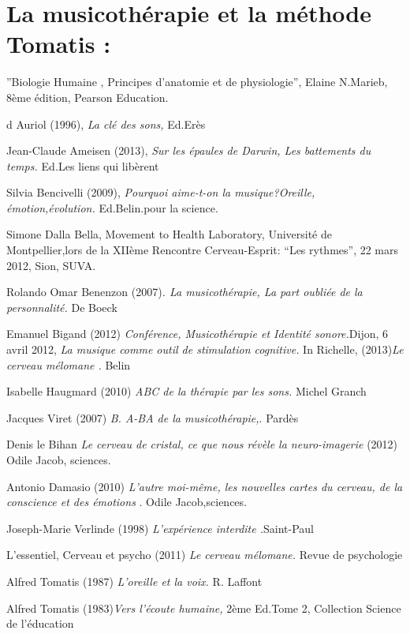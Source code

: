 \documentclass[12pt,french]{report}
\begin{document}
\section{La musicothérapie et la méthode Tomatis : }
\begin{thebibliography}{10}
''Biologie Humaine , Principes d'anatomie et de physiologie'',
Elaine N.Marieb, 8ème édition, Pearson Education.

d Auriol (1996), \emph{La clé des sons, }Ed.Erès

Jean-Claude Ameisen (2013), \emph{Sur les épaules
de Darwin, Les battements du temps. }Ed\emph{.}Les liens qui libèrent

Silvia Bencivelli (2009),\emph{ Pourquoi aime-t-on
la musique?Oreille, émotion,évolution. }Ed.Belin.pour la science.

Simone Dalla Bella, Movement to Health Laboratory,
Université de Montpellier,lors de la XIIème Rencontre Cerveau-Esprit:
``Les rythmes'', 22 mars 2012, Sion, SUVA.

Rolando Omar Benenzon (2007)\emph{. La musicothérapie,
La part oubliée de la personnalité. }De Boeck

Emanuel Bigand (2012) \emph{Conférence, Musicothérapie
et Identité sonore.}Dijon, 6 avril 2012,\emph{ La musique comme outil
de stimulation cognitive. }In Richelle, (2013)\emph{Le cerveau mélomane
. }Belin

Isabelle Haugmard (2010) \emph{ABC de la thérapie
par les sons. }Michel Granch

Jacques Viret (2007) \emph{B. A-BA de la musicothérapie,}.
Pardès

Denis le Bihan \emph{Le cerveau de cristal, ce que
nous révèle la neuro-imagerie} (2012) Odile Jacob, sciences.

Antonio Damasio (2010) \emph{L'autre moi-même, les
nouvelles cartes du cerveau, de la conscience et des émotions }. Odile
Jacob,sciences.

Joseph-Marie Verlinde (1998) \emph{L'expérience interdite
.}Saint-Paul

L'essentiel, Cerveau et psycho (2011) \emph{Le cerveau
mélomane. }Revue de psychologie

Alfred Tomatis (1987) \emph{L'oreille et la voix.
}R. Laffont

Alfred Tomatis\emph{ }(1983)\emph{Vers l'écoute
humaine, }2ème Ed.Tome 2, Collection Science de l'éducation


\end{thebibliography}
\end{document}
